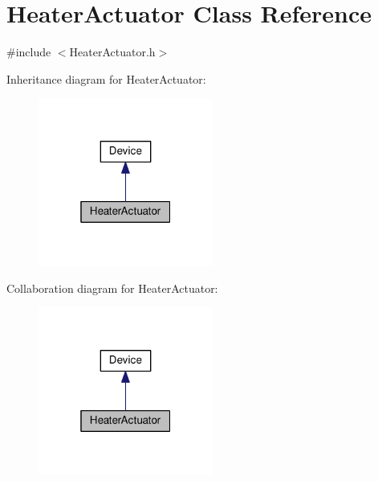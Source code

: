 \hypertarget{class_heater_actuator}{}\section{Heater\+Actuator Class Reference}
\label{class_heater_actuator}


{\ttfamily \#include $<$Heater\+Actuator.\+h$>$}



Inheritance diagram for Heater\+Actuator\+:\nopagebreak
\begin{figure}[H]
\begin{center}
\leavevmode
\includegraphics[width=163pt]{class_heater_actuator__inherit__graph}
\end{center}
\end{figure}


Collaboration diagram for Heater\+Actuator\+:\nopagebreak
\begin{figure}[H]
\begin{center}
\leavevmode
\includegraphics[width=163pt]{class_heater_actuator__coll__graph}
\end{center}
\end{figure}
